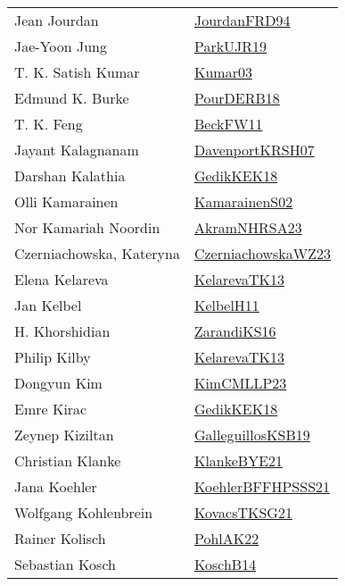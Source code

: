 {\begin{longtable}{p{4cm}p{20cm}}
Jean Jourdan & \href{}{JourdanFRD94}\cite{JourdanFRD94} \\
Jae{-}Yoon Jung & \href{papers/ParkUJR19.pdf}{ParkUJR19}\cite{ParkUJR19} \\
T. K. Satish Kumar & \href{papers/Kumar03.pdf}{Kumar03}\cite{Kumar03} \\
Edmund K. Burke & \href{articles/PourDERB18.pdf}{PourDERB18}\cite{PourDERB18} \\
T. K. Feng & \href{}{BeckFW11}\cite{BeckFW11} \\
Jayant Kalagnanam & \href{papers/DavenportKRSH07.pdf}{DavenportKRSH07}\cite{DavenportKRSH07} \\
Darshan Kalathia & \href{articles/GedikKEK18.pdf}{GedikKEK18}\cite{GedikKEK18} \\
Olli Kamarainen & \href{papers/KamarainenS02.pdf}{KamarainenS02}\cite{KamarainenS02} \\
Nor Kamariah Noordin & \href{articles/AkramNHRSA23.pdf}{AkramNHRSA23}\cite{AkramNHRSA23} \\
Czerniachowska, Kateryna & \href{articles/CzerniachowskaWZ23.pdf}{CzerniachowskaWZ23}\cite{CzerniachowskaWZ23} \\
Elena Kelareva & \href{papers/KelarevaTK13.pdf}{KelarevaTK13}\cite{KelarevaTK13} \\
Jan Kelbel & \href{articles/KelbelH11.pdf}{KelbelH11}\cite{KelbelH11} \\
H. Khorshidian & \href{articles/ZarandiKS16.pdf}{ZarandiKS16}\cite{ZarandiKS16} \\
Philip Kilby & \href{papers/KelarevaTK13.pdf}{KelarevaTK13}\cite{KelarevaTK13} \\
Dongyun Kim & \href{papers/KimCMLLP23.pdf}{KimCMLLP23}\cite{KimCMLLP23} \\
Emre Kirac & \href{articles/GedikKEK18.pdf}{GedikKEK18}\cite{GedikKEK18} \\
Zeynep Kiziltan & \href{papers/GalleguillosKSB19.pdf}{GalleguillosKSB19}\cite{GalleguillosKSB19} \\
Christian Klanke & \href{papers/KlankeBYE21.pdf}{KlankeBYE21}\cite{KlankeBYE21} \\
Jana Koehler & \href{articles/KoehlerBFFHPSSS21.pdf}{KoehlerBFFHPSSS21}\cite{KoehlerBFFHPSSS21} \\
Wolfgang Kohlenbrein & \href{papers/KovacsTKSG21.pdf}{KovacsTKSG21}\cite{KovacsTKSG21} \\
Rainer Kolisch & \href{articles/PohlAK22.pdf}{PohlAK22}\cite{PohlAK22} \\
Sebastian Kosch & \href{papers/KoschB14.pdf}{KoschB14}\cite{KoschB14} \\

\end{longtable}}
